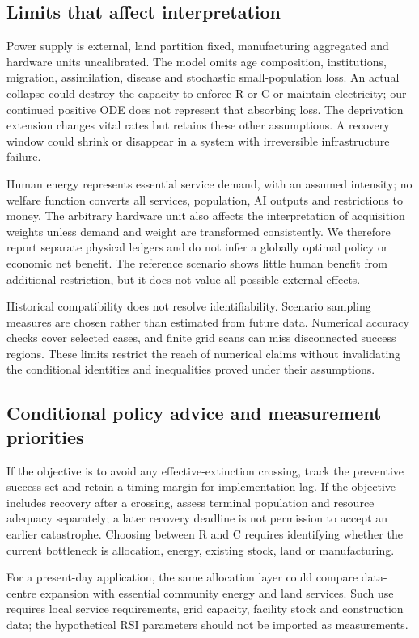 \documentclass[12pt,a4paper]{article}
\theoremstyle{remark}
\begin{document}
\subsection{Limits that affect interpretation}
Power supply is external, land partition fixed, manufacturing aggregated and hardware units uncalibrated. The model omits age composition, institutions, migration, assimilation, disease and stochastic small-population loss. An actual collapse could destroy the capacity to enforce R or C or maintain electricity; our continued positive ODE does not represent that absorbing loss. The deprivation extension changes vital rates but retains these other assumptions. A recovery window could shrink or disappear in a system with irreversible infrastructure failure.

Human energy represents essential service demand, with an assumed intensity; no welfare function converts all services, population, AI outputs and restrictions to money. The arbitrary hardware unit also affects the interpretation of acquisition weights unless demand and weight are transformed consistently. We therefore report separate physical ledgers and do not infer a globally optimal policy or economic net benefit. The reference scenario shows little human benefit from additional restriction, but it does not value all possible external effects.

Historical compatibility does not resolve identifiability. Scenario sampling measures are chosen rather than estimated from future data. Numerical accuracy checks cover selected cases, and finite grid scans can miss disconnected success regions. These limits restrict the reach of numerical claims without invalidating the conditional identities and inequalities proved under their assumptions.

\subsection{Conditional policy advice and measurement priorities}
If the objective is to avoid any effective-extinction crossing, track the preventive success set and retain a timing margin for implementation lag. If the objective includes recovery after a crossing, assess terminal population and resource adequacy separately; a later recovery deadline is not permission to accept an earlier catastrophe. Choosing between R and C requires identifying whether the current bottleneck is allocation, energy, existing stock, land or manufacturing.

For a present-day application, the same allocation layer could compare data-centre expansion with essential community energy and land services. Such use requires local service requirements, grid capacity, facility stock and construction data; the hypothetical RSI parameters should not be imported as measurements.
\end{document}
